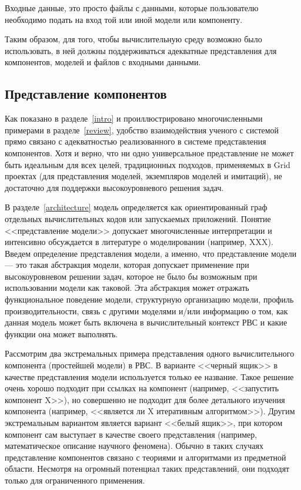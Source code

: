 Входные данные, это просто файлы с данными, которые пользователю необходимо подать на вход той или иной модели или компоненту.
                                 
Таким образом, для того, чтобы вычислительную среду возможно было использовать, в ней должны поддерживаться адекватные представления для компонентов, моделей и файлов с входными данными.

\subsection{Представление компонентов}  

Как показано в разделе~\ref{intro} и проиллюстрировано многочисленными примерами в разделе~\ref{review}, удобство взаимодействия ученого с системой прямо связано с адекватностью реализованного в системе представления компонентов. Хотя и верно, что ни одно универсальное представление не может быть идеальным для всех целей, традиционных подходов, применяемых в Grid проектах (для представления моделей, экземпляров моделей и имитаций), не достаточно для поддержки высокоуровневого решения задач.

В разделе~\ref{architecture} модель определяется как ориентированный граф отдельных вычислительных кодов или запускаемых приложений. Понятие <<представление модели>> допускает многочисленные интерпретации и интенсивно обсуждается в литературе о моделировании (например, XXX). Введем определение представления модели, а именно, что представление модели --- это такая абстракция модели, которая допускает применение при высокоуровневом решении задач, которое не было бы возможным при использовании модели как таковой. Эта абстракция может отражать функциональное поведение модели, структурную организацию модели, профиль производительности, связь с другими моделями и/или информацию о том, как данная модель может быть включена в вычислительный контекст РВС и какие функции она может выполнять.

Рассмотрим два экстремальных примера представления одного вычислительного компонента (простейшей модели) в РВС. В варианте <<черный ящик>> в качестве представления модели используется только ее название. Такое решение очень хорошо подходит при ссылках на компонент (например, <<запустить компонент X>>), но совершенно не подходит для более детального изучения компонента (например, <<является ли X итеративным алгоритмом>>). Другим экстремальным вариантом является вариант <<белый ящик>>, при котором компонент сам выступает в качестве своего представления (например, математическое описание научного феномена). Обычно в таких случаях представление компонентов связано с теориями и алгоритмами из предметной области. Несмотря на огромный потенциал таких представлений, они подходят только для ограниченного применения. 

